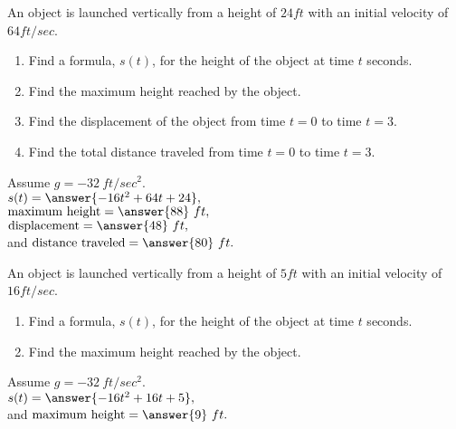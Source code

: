 \documentclass{ximera}
\begin{document}
\begin{problem}
An object is launched vertically from a height of $24 ft$ with an initial velocity of $64 ft/sec$.  
\begin{enumerate}
\item Find a formula, $s(t)$, for the height of the object at time $t$
 seconds.
\item Find the maximum height reached by the object.
\item Find the displacement of the object from time $t = 0$ to time $t = 3$.
\item Find the total distance traveled from time $t = 0$ to time $t = 3$.
\end{enumerate}
Assume $g = -32 \ ft/sec^2$.\\
$s(t) = \answer{-16t^2 + 64t + 24},$\\
$\text{maximum height} =\answer{88} \ ft,$\\
$\text{displacement} =\answer{48} \ ft,$\\
and
$\text{distance traveled} = \answer{80} \ ft.$
\end{problem}

\begin{problem}
An object is launched vertically from a height of $5 ft$ with an initial velocity of $16 ft/sec$.  
\begin{enumerate}
\item Find a formula, $s(t)$, for the height of the object at time $t$
 seconds.
\item Find the maximum height reached by the object.
\end{enumerate}
Assume $g = -32 \ ft/sec^2$.\\
$s(t) = \answer{-16t^2 + 16t + 5},$\\
and
$\text{maximum height} =\answer{9} \ ft.$\\


\end{problem}
\end{document}
